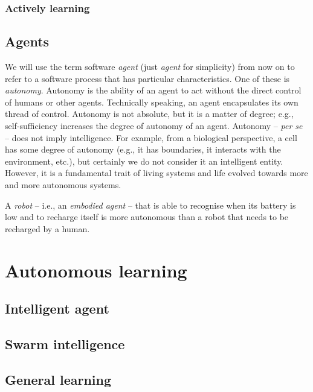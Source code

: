 \subsubsection{}\label{subsubsec:rl}

\subsubsection{Actively learning}\label{subsubsec:actively-learning}

\subsection{Agents}\label{subsec:agents}
%
We will use the term software \emph{agent} (just \emph{agent} for simplicity) from now on to refer to a software process that has particular characteristics.
%
One of these is \emph{autonomy}.
%
Autonomy is the ability of an agent to act without the direct control of humans or other agents.
%
Technically speaking, an agent encapsulates its own thread of control.
%
Autonomy is not absolute, but it is a matter of degree; e.g., self-sufficiency increases the degree of autonomy of an agent.
%
Autonomy -- \emph{per se} -- does not imply intelligence.
%
For example, from a biological perspective, a cell has some degree of autonomy (e.g., it has boundaries, it interacts with the environment, etc.), but certainly we do not consider it an intelligent entity.
%
However, it is a fundamental trait of living systems and life evolved towards more and more autonomous systems.


A \emph{robot} -- i.e., an \emph{embodied agent} -- that is able to recognise when its battery is low and to recharge itself is more autonomous than a robot that needs to be recharged by a human.


\section{Autonomous learning}\label{sec:autonomous-learning}

\subsection{Intelligent agent}\label{subsec:intelligent-agent}

\subsection{}\label{subsec:mas}

\subsection{Swarm intelligence}\label{subsec:swarm-intelligence}


\subsection{General learning}\label{subsec:general-learning}
